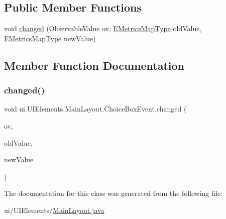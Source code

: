 \subsection*{Public Member Functions}
\begin{DoxyCompactItemize}
\item 
void \mbox{\hyperlink{classui_1_1_u_i_elements_1_1_main_layout_1_1_choice_box_event_af998d2628f0de4c269bdae038d030060}{changed}} (Observable\+Value ov, \mbox{\hyperlink{enumanalyse_1_1_e_metrics_map_type}{E\+Metrics\+Map\+Type}} old\+Value, \mbox{\hyperlink{enumanalyse_1_1_e_metrics_map_type}{E\+Metrics\+Map\+Type}} new\+Value)
\end{DoxyCompactItemize}


\subsection{Member Function Documentation}
\mbox{\label{classui_1_1_u_i_elements_1_1_main_layout_1_1_choice_box_event_af998d2628f0de4c269bdae038d030060}} 
\subsubsection{\texorpdfstring{changed()}{changed()}}
{\footnotesize\ttfamily void ui.\+U\+I\+Elements.\+Main\+Layout.\+Choice\+Box\+Event.\+changed (\begin{DoxyParamCaption}\item[{Observable\+Value}]{ov,  }\item[{\mbox{\hyperlink{enumanalyse_1_1_e_metrics_map_type}{E\+Metrics\+Map\+Type}}}]{old\+Value,  }\item[{\mbox{\hyperlink{enumanalyse_1_1_e_metrics_map_type}{E\+Metrics\+Map\+Type}}}]{new\+Value }\end{DoxyParamCaption})\hspace{0.3cm}{\ttfamily [inline]}}



The documentation for this class was generated from the following file\+:\begin{DoxyCompactItemize}
\item 
ui/\+U\+I\+Elements/\mbox{\hyperlink{_main_layout_8java}{Main\+Layout.\+java}}\end{DoxyCompactItemize}
